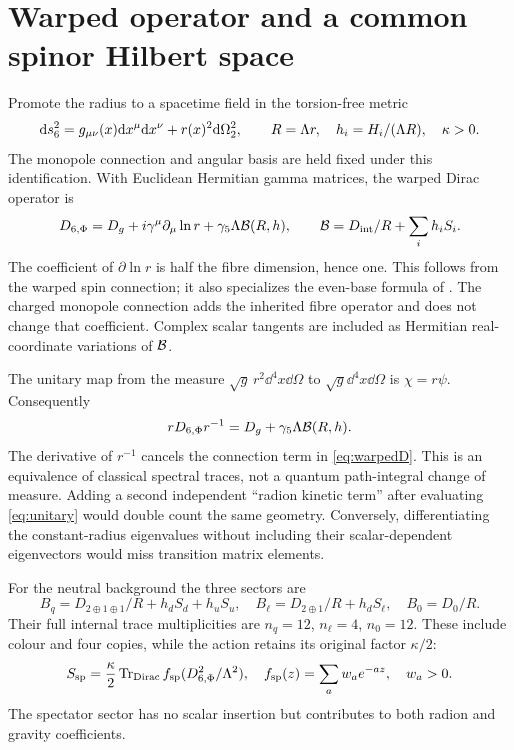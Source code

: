 \section{Warped operator and a common spinor Hilbert space}

Promote the radius to a spacetime field in the torsion-free metric
\begin{equation}
 \mathrm d s_6^2=g_{\mu\nu}(x)\mathrm d x^\mu\mathrm d x^\nu+r(x)^2\mathrm d\Omega_2^2,
 \qquad R=\Lambda r,\quad h_i=H_i/(\Lambda R),\quad\kappa>0.
 \label{eq:metric}
\end{equation}
The monopole connection and angular basis are held fixed under this identification. With Euclidean Hermitian gamma matrices, the warped Dirac operator is
\begin{equation}
 D_{6,\Phi}=D_g+i\gamma^\mu\partial_\mu\ln r
       +\gamma_5\Lambda\mathcal B(R,h),\qquad
 \mathcal B=D_{\rm int}/R+\sum_i h_i S_i .
 \label{eq:warpedD}
\end{equation}
The coefficient of $\partial\ln r$ is half the fibre dimension, hence one. This follows from the warped spin connection; it also specializes the even-base formula of \cite{warped}. The charged monopole connection adds the inherited fibre operator and does not change that coefficient. Complex scalar tangents are included as Hermitian real-coordinate variations of $\mathcal B$.

The unitary map from the measure $\sqrt g\,r^2\dd^4x\dd\Omega$ to $\sqrt g\dd^4x\dd\Omega$ is $\chi=r\psi$. Consequently
\begin{equation}
 rD_{6,\Phi}r^{-1}=D_g+\gamma_5\Lambda\mathcal B(R,h).
 \label{eq:unitary}
\end{equation}
The derivative of $r^{-1}$ cancels the connection term in \eqref{eq:warpedD}. This is an equivalence of classical spectral traces, not a quantum path-integral change of measure. Adding a second independent ``radion kinetic term'' after evaluating \eqref{eq:unitary} would double count the same geometry. Conversely, differentiating the constant-radius eigenvalues without including their scalar-dependent eigenvectors would miss transition matrix elements.

For the neutral background the three sectors are
\begin{equation}
 B_q=D_{2\oplus1\oplus1}/R+h_dS_d+h_uS_u,\quad
 B_\ell=D_{2\oplus1}/R+h_dS_\ell,\quad B_0=D_0/R.
\end{equation}
Their full internal trace multiplicities are $n_q=12$, $n_\ell=4$, $n_0=12$. These include colour and four copies, while the action retains its original factor $\kappa/2$:
\begin{equation}
 S_{\rm sp}=\frac\kappa2\operatorname{Tr}_{\rm Dirac} f_{\rm sp}(D_{6,\Phi}^2/\Lambda^2),
 \quad f_{\rm sp}(z)=\sum_a w_ae^{-az},\quad w_a>0.
\end{equation}
The spectator sector has no scalar insertion but contributes to both radion and gravity coefficients.

